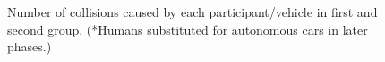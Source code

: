 \documentclass[11pt,english]{article}
\begin{document}
\begin{figure}[h] %
\caption{Number of collisions caused by each participant/vehicle in first and second group. (*Humans substituted for autonomous cars in later phases.)}
\label{fig:collisions_total}
\end{figure}
\end{document}
